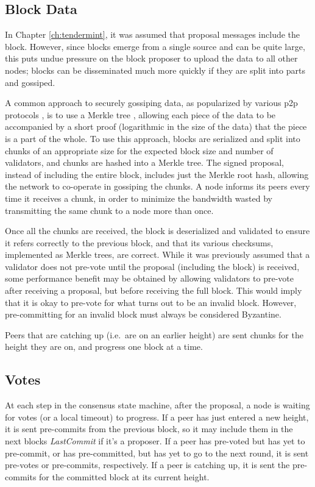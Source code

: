 \subsection{Block Data}
In Chapter \ref{ch:tendermint}, it was assumed that proposal messages include the block.
However, since blocks emerge from a single source and can be quite large, 
this puts undue pressure on the block proposer to upload the data to all other nodes;
blocks can be disseminated much more quickly if they are split into parts and gossiped.

A common approach to securely gossiping data, as popularized by various p2p protocols \cite{bittorrent,libswift}, 
is to use a Merkle tree \cite{merkle1987digital},
allowing each piece of the data to be accompanied by a short proof (logarithmic in the size of the data)
that the piece is a part of the whole. 
To use this approach, 
blocks are serialized and split into chunks of an appropriate size 
for the expected block size and number of validators,
and chunks are hashed into a Merkle tree. 
The signed proposal, instead of including the entire block, includes just the Merkle root hash,
allowing the network to co-operate in gossiping the chunks.
A node informs its peers every time it receives a chunk, 
in order to minimize the bandwidth wasted by transmitting the same chunk to a node more than once.

Once all the chunks are received, the block is deserialized and validated to ensure it refers correctly to the previous 
block, and that its various checksums, implemented as Merkle trees, are correct. 
While it was previously assumed that a validator does not pre-vote until the proposal (including the block) is received,
some performance benefit may be obtained by allowing validators to pre-vote after receiving a proposal, 
but before receiving the full block. This would imply that it is okay to pre-vote for what turns out to be an invalid block.
However, pre-committing for an invalid block must always be considered Byzantine.

Peers that are catching up (i.e.~are on an earlier height) are sent chunks for the height they are on,
and progress one block at a time.

\subsection{Votes}

At each step in the consensus state machine, after the proposal, a node is waiting for votes (or a local timeout) to progress.
If a peer has just entered a new height, it is sent pre-commits from the previous block,
so it may include them in the next blocks \emph{LastCommit} if it's a proposer.
If a peer has pre-voted but has yet to pre-commit, or has pre-committed, but has yet to go to the next round,
it is sent pre-votes or pre-commits, respectively.
If a peer is catching up, it is sent the pre-commits for the committed block at its current height.

